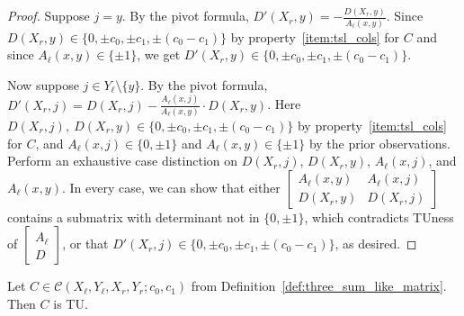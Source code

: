 \begin{proof}
    Suppose $j = y$. By the pivot formula, $D' (X_{r}, y) = -\frac{D (X_{r}, y)}{A_{\ell} (x, y)}$. Since $D (X_{r}, y) \in \{0, \pm c_{0}, \pm c_{1}, \pm (c_{0} - c_{1})\}$ by property~\ref{item:tsl_cols} for $C$ and since $A_{\ell} (x, y) \in \{\pm 1\}$, we get $D' (X_{r}, y) \in \{0, \pm c_{0}, \pm c_{1}, \pm (c_{0} - c_{1})\}$.

    Now suppose $j \in Y_{\ell} \setminus \{y\}$. By the pivot formula, $D' (X_{r}, j) = D (X_{r}, j) - \frac{A_{\ell} (x, j)}{A_{\ell} (x, y)} \cdot D (X_{r}, y)$. Here $D (X_{r}, j), \ D (X_{r}, y) \in \{0, \pm c_{0}, \pm c_{1}, \pm (c_{0} - c_{1})\}$ by property~\ref{item:tsl_cols} for $C$, and $A_{\ell} (x, j) \in \{0, \pm 1\}$ and $A_{\ell} (x, y) \in \{\pm 1\}$ by the prior observations. Perform an exhaustive case distinction on $D (X_{r}, j)$, $D (X_{r}, y)$, $A_{\ell} (x, j)$, and $A_{\ell} (x, y)$. In every case, we can show that either $\begin{bmatrix} A_{\ell} (x, y) & A_{\ell} (x, j) \\ D (X_{r}, y) & D (X_{r}, j) \end{bmatrix}$ contains a submatrix with determinant not in $\{0, \pm 1\}$, which contradicts TUness of $\begin{bmatrix} A_{\ell} \\ D \end{bmatrix}$, or that $D' (X_{r}, j) \in \{0, \pm c_{0}, \pm c_{1}, \pm (c_{0} - c_{1})\}$, as desired. 
\end{proof}

\begin{lemma}\label{lem:three_sum_like_tu}
    Let $C \in \mathcal{C} (X_{\ell}, Y_{\ell}, X_{r}, Y_{r}; c_{0}, c_{1})$ from Definition~\ref{def:three_sum_like_matrix}. Then $C$ is TU.
\end{lemma}

